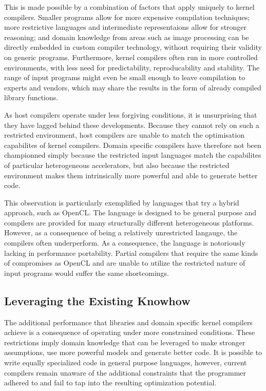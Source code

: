     This is made possible by a combination of factors that apply uniquely to
    kernel compilers.
    Smaller programs allow for more expensive compilation techniques;
    more restrictive languages and intermediate representaions allow for
    stronger reasoning;
    and domain knowledge from areas such as image processing can be directly
    embedded in custom compiler technology, without requiring their validity
    on generic programs.
    Furthermore, kernel compilers often run in more controlled environments,
    with less need for predictability, reproducability and stability.
    The range of input programs might even be small enough to leave compilation
    to experts and vendors, which may share the results in the form of already
    compiled library functions.

    As host compilers operate under less forgiving conditions, it is
    unsurprising that they have lagged behind these developments.
    Because they cannot rely on such a restricted environment, host compilers
    are unable to match the optimisation capabilites of kernel compilers.
    Domain specific compilers have therefore not been championned simply because
    the restricted input languages match the capabilites of particular
    heterogeneous accelerators, but also because the restricted environment
    makes them intrinsically more powerful and able to generate better code.

    This observation is particularly exemplified by languages that try a hybrid
    approach, such as OpenCL.
    The language is designed to be general purpose and compilers are provided
    for many structurally different heterogeneous platforms.
    However, as a consequence of being a relatively unrestricted langauge, the
    compilers often underperform.
    As a consequence, the language is notoriously lacking in performance
    portability.
    Partial compilers that require the same kinds of compromises as OpenCL and
    are unable to utilize the restricted nature of input programs would suffer
    the same shortcomings.

\subsection*{Leveraging the Existing Knowhow}

    The additional performance that libraries and domain specific kernel
    compilers achieve is a consequence of operating under more constrained
    conditions.
    These restrictions imply domain knowledge that can be leveraged to make
    stronger assumptions, use more powerful models and generate better code.
    It is possible to write equally specialized code in general purpose
    languages, however, current compilers remain unaware of the additional
    constraints that the programmer adhered to and fail to tap into the
    resulting optimization potential.

